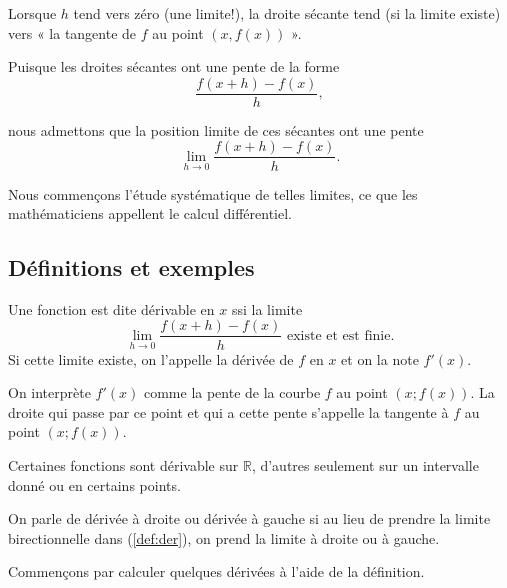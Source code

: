 \documentclass[a4paper,12pt]{article}
\begin{document}
\vspace{0.5cm}

Lorsque $h$ tend vers zéro (une limite!), la droite sécante tend (si la limite existe) vers « la tangente de $f$ au point $(x, f(x))$ ».

Puisque les droites sécantes ont une pente de la forme
\begin{equation}
\frac{f(x + h) - f(x)}{h},
\end{equation}

nous admettons que la position limite de ces sécantes ont une pente
\begin{equation}
\lim_{h \to 0} \frac{f(x + h) - f(x)}{h}.
\end{equation}

Nous commençons l'étude systématique de telles limites, ce que les mathématiciens appellent le calcul différentiel.

\begin{center}
\end{center}
\subsection{Définitions et exemples}
\begin{definition}
	\tcblower
	Une fonction est dite dérivable en $x$ ssi la limite
	\begin{equation}
		\lim_{h\to0}\dfrac{ f(x+h)-f(x)}{h} \text{ existe et est finie.}
		\label{def:der}
		\tag{$\star$}
	\end{equation}
	Si cette limite existe, on l'appelle la dérivée de $f$ en $x$ et on la note $f'(x)$.  
\end{definition}
\begin{definition}
	\tcblower
On interprète $f'(x)$ comme la pente de la courbe $f$ au point $(x;f(x))$. La droite qui passe par ce point et qui a cette pente s'appelle la tangente à $f$ au point $(x;f(x))$. 
\end{definition}
\begin{remarque}
	\tcblower
	Certaines fonctions sont dérivable sur $\mathbb{R}$, d'autres seulement sur un intervalle donné ou en certains points.
\end{remarque}
\begin{remarque}[label=rem:derdg]
	\tcblower 
On parle de dérivée à droite ou dérivée à gauche si au lieu de prendre la limite birectionnelle dans (\ref{def:der}), on prend la limite à droite ou à gauche.
\end{remarque}
\begin{autre}
	\tcblower
	Commençons par calculer quelques dérivées à l'aide de la définition.
\end{autre}
\end{document}
